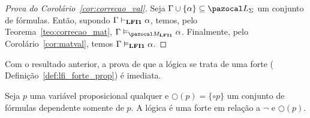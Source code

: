     \begin{proof}[Prova do Corolário~\ref{cor:correcao_val}]
        Seja $\Gamma \cup \{\alpha\} \subseteq \ling{}$ um conjunto de fórmulas. Então, supondo $\Gamma \vdash_{{\normalfont\textbf{LFI1}}{}} \alpha$, temos, pelo Teorema~\ref{teo:correcao_mat}, $\Gamma \conmat \alpha$. Finalmente, pelo Corolário~\ref{cor:matval}, temos $\Gamma \vDash_{{\normalfont\textbf{LFI1}}{}} \alpha$.
    \end{proof}

    Com o resultado anterior, a prova de que a lógica \lfium{} se trata de uma \lfi{} forte ( Definição~\ref{def:lfi_forte_prop}) é imediata.

    \begin{corolario}\label{cor:lfi_forte}
        Seja $p$ uma variável proposicional qualquer e $\bigcirc(p) = \{\circ p\}$ um conjunto de fórmulas dependente somente de $p$. A lógica \lfium{} é uma \lfi{} forte em relação a $\neg$ e $\bigcirc(p)$.
    \end{corolario}

